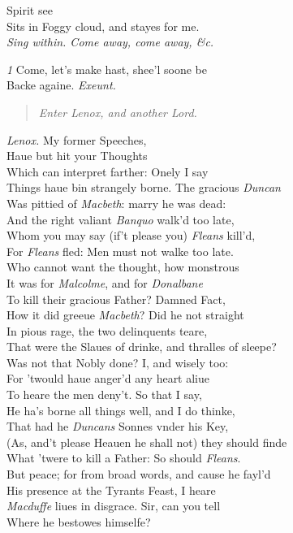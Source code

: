 \documentclass[12pt]{sides}
\newcommand{\StageDir}[1]{\begin{quote}\centering\em #1\end{quote}}
\newcommand{\elStageDir}[1]{\hfill\textit{#1}}
\newcommand{\dia}[1]{\hskip 15pt\textit{#1}\hskip 6pt}
\begin{document}
\begin{multicols}{2}
Spirit see \\ Sits in Foggy cloud, and stayes for me. \\ \elStageDir{Sing within. Come away, come away, \&c.}

            \dia{1} Come, let's make hast, shee'l soone be \\ Backe againe. \elStageDir{Exeunt.}
            \StageDir{Enter Lenox, and another Lord.}
            \dia{Lenox.} My former Speeches, \\ Haue but hit your Thoughts \\ Which can interpret farther: Onely I say \\ Things haue bin strangely borne. The gracious \textit{Duncan} \\ Was pittied of \textit{Macbeth}: marry he was dead: \\ And the right valiant \textit{Banquo} walk'd too late, \\ Whom you may say (if't please you) \textit{Fleans} kill'd, \\ For \textit{Fleans} fled: Men must not walke too late. \\ Who cannot want the thought, how monstrous \\ It was for \textit{Malcolme}, and for \textit{Donalbane} \\ To kill their gracious Father? Damned Fact, \\ How it did greeue \textit{Macbeth}? Did he not straight \\ In pious rage, the two delinquents teare, \\ That were the Slaues of drinke, and thralles of sleepe? \\ Was not that Nobly done? I, and wisely too: \\ For 'twould haue anger'd any heart aliue \\ To heare the men deny't. So that I say, \\ He ha's borne all things well, and I do thinke, \\ That had he \textit{Duncans} Sonnes vnder his Key, \\ (As, and't please Heauen he shall not) they should finde \\ What 'twere to kill a Father: So should \textit{Fleans}. \\ But peace; for from broad words, and cause he fayl'd \\ His presence at the Tyrants Feast, I heare \\ \textit{Macduffe} liues in disgrace. Sir, can you tell \\ Where he bestowes himselfe?


\end{multicols}
\end{document}
